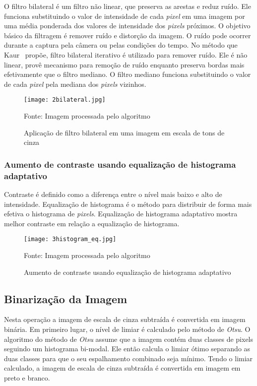 O filtro bilateral é um filtro não linear, que preserva as arestas e reduz ruído.
Ele funciona substituindo o valor de intensidade de cada \emph{pixel} em uma imagem
por uma média ponderada dos valores de intensidade dos \emph{pixels} próximos.
O objetivo básico da filtragem é remover ruído e distorção da imagem. O ruído
pode ocorrer durante a captura pela câmera ou pelas condições do tempo. No
método que Kaur~\cite{kaur2014efficient} propõe, filtro bilateral iterativo é
utilizado para remover ruído. Ele é não linear, provê mecanismo para remoção de
ruído enquanto preserva bordas mais efetivamente que o filtro mediano. O filtro
mediano funciona substituindo o valor de cada \emph{pixel} pela mediana dos \emph{pixels}
vizinhos.

\begin{figure}[H]
	\centering
	\texttt{[image: 2bilateral.jpg]}
	\caption{Aplicação de filtro bilateral em uma imagem em escala de tons de cinza}
Fonte: Imagem processada pelo algoritmo
	\label{fig:ext_filter_in_gray_scale}
\end{figure}

\subsubsection{Aumento de contraste usando equalização de histograma adaptativo}

Contraste é definido como a diferença entre o nível mais baixo e alto de
intensidade. Equalização de histograma é o método para distribuir de forma mais
efetiva o histograma de \emph{pixels}. Equalização de histograma adaptativo
mostra melhor contraste em relação a equalização de histograma.

\begin{figure}[H]
	\centering
	\texttt{[image: 3histogram\_eq.jpg]}
	\caption{Aumento de contraste usando equalização de histograma adaptativo}
Fonte: Imagem processada pelo algoritmo
	\label{fig:ext_contrast_adaptive_histogram}
\end{figure}

\subsection{Binarização da Imagem}

Nesta operação a imagem de escala de cinza subtraída é convertida em imagem
binária. Em primeiro lugar, o nível de limiar é calculado pelo método de \emph{Otsu}.
O algoritmo do método de \emph{Otsu} assume que  a imagem contém duas classes de pixels
seguindo um histograma bi-modal. Ele então calcula o limiar ótimo separando as
duas classes para que o seu espalhamento combinado seja mínimo.
Tendo o limiar calculado, a imagem de escala de cinza subtraída é convertida em
imagem em preto e branco.

